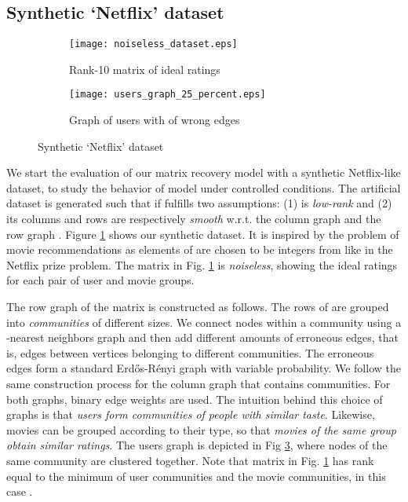 \documentclass{article}
\begin{document}
\subsection{Synthetic `Netflix' dataset}
\vspace{-0.25cm}
\begin{figure}
\label{fig:artificial_data}
          \begin{subfigure}[b]{.5\linewidth}
            \centering\texttt{[image: noiseless\_dataset.eps]}
            \vspace{-0.25cm}
            \caption{Rank-10 matrix  of ideal ratings}\label{fig:art_M_noiseless}
          \end{subfigure}
           \begin{subfigure}[b]{.5\linewidth}
            \centering \texttt{[image: users\_graph\_25\_percent.eps]}
            \vspace{-0.25cm}
            \caption{Graph of users with  of wrong edges}\label{fig:artificial_G_u}
          \end{subfigure}
        \caption{Synthetic `Netflix' dataset}
	\vspace{-0.25cm}
\end{figure}
We start the evaluation of our matrix recovery model with a synthetic Netflix-like dataset, to study the behavior of model under controlled conditions. 
The artificial dataset  is generated such that if fulfills two assumptions: (1)  is \textit{low-rank} and (2) its columns and rows are respectively \textit{smooth} w.r.t. the column graph  and the row graph . 
Figure \ref{fig:art_M_noiseless} shows our synthetic dataset. It is inspired by the problem of movie recommendations as elements of  are chosen to be integers from  like in the Netflix prize problem. The matrix in Fig. \ref{fig:art_M_noiseless} is \textit{noiseless}, showing the ideal ratings for each pair of user and movie groups.  



The row graph  of the matrix  is constructed as follows. The rows of  are grouped into  \textit{communities} of different sizes. We connect nodes within a community using a -nearest neighbors graph and then add different amounts of erroneous edges, that is, edges between vertices belonging to different communities. The erroneous edges form a standard Erd\H{o}s-R\'{e}nyi graph with variable probability. We follow the same construction process for the column graph  that contains  communities. For both graphs, binary edge weights are used. The intuition behind this choice of graphs is that \textit{users form communities of people with similar taste}. Likewise, movies can be grouped according to their type, so that \textit{movies of the same group obtain similar ratings}. The users graph is depicted in Fig \ref{fig:artificial_G_u}, where nodes of the same community are clustered together. Note that matrix  in Fig. \ref{fig:art_M_noiseless} has rank equal to the minimum of user communities and the movie communities, in this case . 
\end{document}
